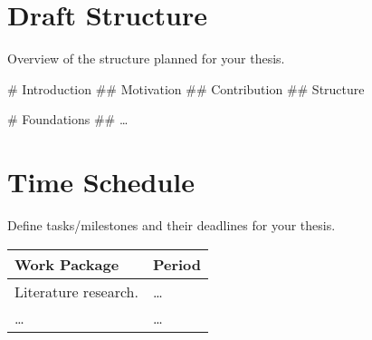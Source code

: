 \documentclass{scrartcl}
\begin{document}
\section{Draft Structure}\label{sec:draft}
Overview of the structure planned for your thesis.

\begin{easylist}[articletoc]
  # Introduction
  ## Motivation
  ## Contribution
  ## Structure

  # Foundations
  ## \dots
\end{easylist}

\section{Time Schedule}\label{sec:schedule}
Define tasks/milestones and their deadlines for your thesis.

\begin{longtable}{ll}
  \toprule

  \textbf{Work Package} & \textbf{Period} \\%
  \midrule%
  \endhead%

  Literature research.  & \dots           \\
  \dots                 & \dots           \\

  \bottomrule
\end{longtable}

\printbibliography
\end{document}
